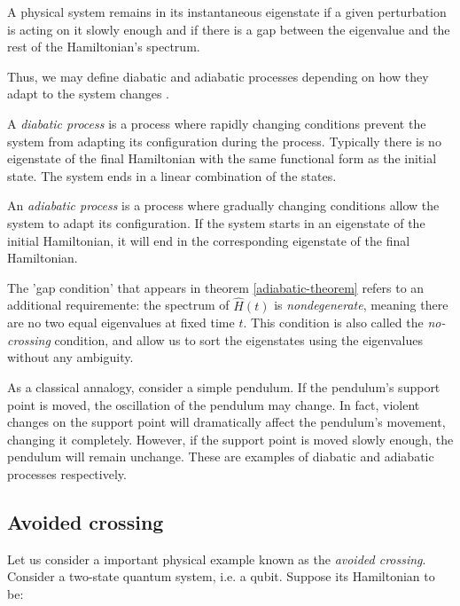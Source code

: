 \begin{theorem}
\label{adiabatic-theorem}
	A physical system remains in its instantaneous eigenstate if a given perturbation is acting on it slowly enough and if there is a gap between the eigenvalue and the rest of the Hamiltonian's spectrum.
\end{theorem}

Thus, we may define diabatic and adiabatic processes depending on how they adapt to the system changes \cite{Kato1950}.

\begin{definition}
	A \emph{diabatic process} is a process where rapidly changing conditions prevent the system from adapting its configuration during the process. Typically there is no eigenstate of the final Hamiltonian with the same functional form as the initial state. The system ends in a linear combination of the states.
\end{definition}

\begin{definition}
	An \emph{adiabatic process} is a process where gradually changing conditions allow the system to adapt its configuration. If the system starts in an eigenstate of the initial Hamiltonian, it will end in the corresponding eigenstate of the final Hamiltonian.
\end{definition}

The 'gap condition' that appears in theorem \ref{adiabatic-theorem} refers to an additional requiremente: the spectrum of $\hat H(t)$ is \emph{nondegenerate}, meaning there are no two equal eigenvalues at fixed time $t$. This condition is also called the \emph{no-crossing} condition, and allow us to sort the eigenstates using the eigenvalues without any ambiguity.

As a classical annalogy, consider a simple pendulum. If the pendulum's support point is moved, the oscillation of the pendulum may change. In fact, violent changes on the support point will dramatically affect the pendulum's movement, changing it completely. However, if the support point is moved slowly enough, the pendulum will remain unchange. These are examples of diabatic and adiabatic processes respectively.


\subsection{Avoided crossing}


Let us consider a important physical example known as the \emph{avoided crossing}. Consider a two-state quantum system, i.e. a qubit. Suppose its Hamiltonian to be:


